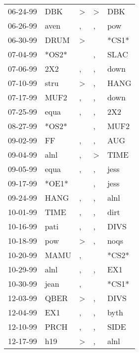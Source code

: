 \begin{supertabular}{lllll}
 06-24-99 &    DBK &     \textgreater &     \textgreater &    DBK \\
 06-26-99 &   aven &                , &                , &    pow \\
 06-30-99 &   DRUM &     \textgreater &                  &  *CS1* \\
 07-04-99 &  *OS2* &                  &                , &   SLAC \\
 07-06-99 &    2X2 &                , &                , &   down \\
 07-10-99 &   stru &     \textgreater &                , &   HANG \\
 07-17-99 &   MUF2 &                , &                , &   down \\
 07-25-99 &   equa &                , &                , &    2X2 \\
 08-27-99 &  *OS2* &                  &                , &   MUF2 \\
 09-02-99 &     FF &                , &                , &    AUG \\
 09-04-99 &   alnl &                , &     \textgreater &   TIME \\
 09-05-99 &   equa &                , &                , &   jess \\
 09-17-99 &  *OE1* &                  &                , &   jess \\
 09-24-99 &   HANG &                , &                , &   alnl \\
 10-01-99 &   TIME &                , &                , &   dirt \\
 10-16-99 &   pati &                , &                , &   DIVS \\
 10-18-99 &    pow &     \textgreater &                , &   noqs \\
 10-20-99 &   MAMU &                , &                  &  *CS2* \\
 10-29-99 &   alnl &                , &                , &    EX1 \\
 10-30-99 &   jean &                , &                  &  *CS1* \\
 12-03-99 &   QBER &     \textgreater &                , &   DIVS \\
 12-04-99 &    EX1 &                , &                , &   byth \\
 12-10-99 &   PRCH &                , &                , &   SIDE \\
 12-17-99 &    h19 &     \textgreater &                , &   alnl \\

\end{supertabular}
